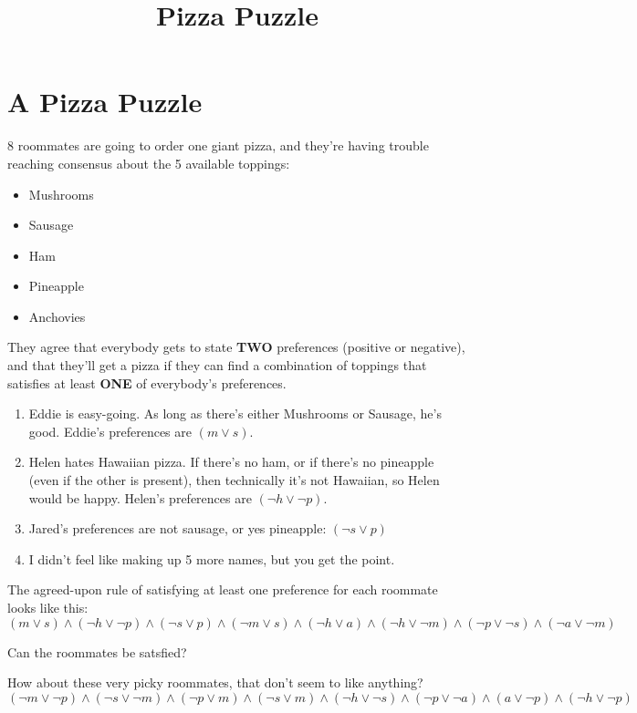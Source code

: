 \documentclass[12pt]{article}
\begin{document}
\title{Pizza Puzzle}
\pagestyle{empty}

\section*{A Pizza Puzzle}
8 roommates are going to order one giant pizza, and they're having trouble
reaching consensus about the 5 available toppings:
\begin{itemize}
\item Mushrooms
\item Sausage
\item Ham
\item Pineapple
\item Anchovies
\end{itemize}

They agree that everybody gets to state {\bf TWO} preferences (positive or
negative), and that they'll get a pizza if they can find a combination of
toppings that satisfies at least {\bf ONE} of everybody's preferences.

\begin{enumerate}
\item Eddie is easy-going. As long as there's either Mushrooms or Sausage, he's
  good. Eddie's preferences are $(m \lor s)$.
\item Helen {\sc hates} Hawaiian pizza. If there's no ham, or if there's no
  pineapple (even if the other is present), then technically it's not Hawaiian,
  so Helen would be happy. Helen's preferences are $(\neg h \lor \neg p)$.
\item Jared's preferences are not sausage, or yes pineapple: $(\neg s \lor p)$
\item I didn't feel like making up 5 more names, but you get the point.
\end{enumerate}

The agreed-upon rule of satisfying at least one preference for each roommate looks like this:
$$(m \lor s) \land
(\neg h \lor \neg p) \land
(\neg s \lor p) \land
(\neg m \lor s) \land
(\neg h \lor a) \land
(\neg h \lor \neg m) \land
(\neg p \lor \neg s) \land
(\neg a \lor \neg m)$$

Can the roommates be satsfied?

\vspace{1cm}
How about these very picky roommates, that don't seem to like anything?
$$(\neg m \lor \neg p) \land
(\neg s \lor \neg m) \land
(\neg p \lor m) \land
(\neg s \lor m) \land
(\neg h \lor \neg s) \land
(\neg p \lor \neg a) \land
(a \lor \neg p) \land
(\neg h \lor \neg p)$$
\end{document}
